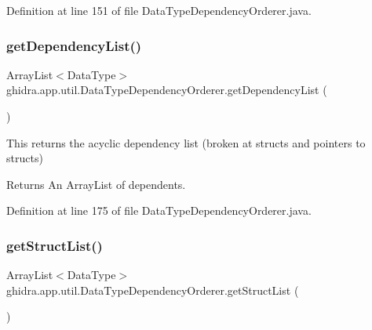 Definition at line 151 of file Data\+Type\+Dependency\+Orderer.\+java.

\mbox{\label{classghidra_1_1app_1_1util_1_1_data_type_dependency_orderer_abdf912e6b46418382ad23fb1d119dc62}} 
\subsubsection{\texorpdfstring{getDependencyList()}{getDependencyList()}}
{\footnotesize\ttfamily Array\+List$<$Data\+Type$>$ ghidra.\+app.\+util.\+Data\+Type\+Dependency\+Orderer.\+get\+Dependency\+List (\begin{DoxyParamCaption}{ }\end{DoxyParamCaption})\hspace{0.3cm}{\ttfamily [inline]}}

This returns the acyclic dependency list (broken at structs and pointers to structs) \begin{DoxyReturn}{Returns}
An Array\+List of dependents. 
\end{DoxyReturn}


Definition at line 175 of file Data\+Type\+Dependency\+Orderer.\+java.

\mbox{\label{classghidra_1_1app_1_1util_1_1_data_type_dependency_orderer_a83bf4d498139bbcc653983e7d3fb6055}} 
\subsubsection{\texorpdfstring{getStructList()}{getStructList()}}
{\footnotesize\ttfamily Array\+List$<$Data\+Type$>$ ghidra.\+app.\+util.\+Data\+Type\+Dependency\+Orderer.\+get\+Struct\+List (\begin{DoxyParamCaption}{ }\end{DoxyParamCaption})\hspace{0.3cm}{\ttfamily [inline]}}

